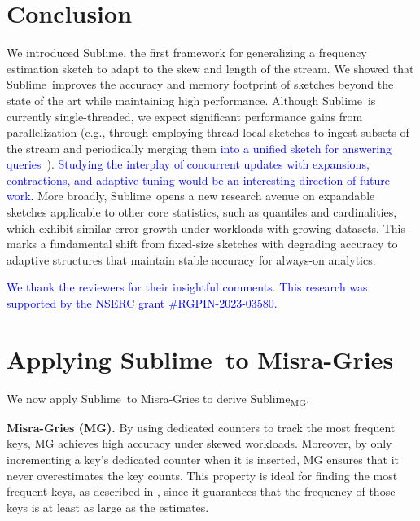 \documentclass[sigconf]{acmart}
\newcommand{\sketch}{Sublime}
\newcommand{\sketchmg}{\sketch\textsubscript{MG}\xspace}
\begin{document}
\section{Conclusion}
We introduced \sketch, the first framework for generalizing a frequency
estimation sketch to adapt to the skew and length of the stream. We showed that
\sketch\ improves the accuracy and memory footprint of sketches beyond the
state of the art while maintaining high performance. Although \sketch\ is
currently single-threaded, we expect significant performance gains from
parallelization (e.g., through employing thread-local sketches to ingest
subsets of the stream and periodically merging them \textcolor{blue}{into a unified sketch for
answering queries}~\cite{FastConcurrentDataSketches,FPGASketching}). \textcolor{blue}{Studying
the interplay of concurrent updates with expansions, contractions, and adaptive
tuning would be an interesting direction of future work.} More broadly, \sketch\
opens a new research avenue on expandable sketches applicable to other core
statistics, such as quantiles and cardinalities, which exhibit similar error
growth under workloads with growing datasets. This marks a fundamental shift
from fixed-size sketches with degrading accuracy to adaptive structures that
maintain stable accuracy for always-on analytics.

\begin{acks}
  \textcolor{blue}{We thank the reviewers for their insightful comments. This
  research was supported by the NSERC grant \#RGPIN-2023-03580.}
\end{acks}





\ifappendix
\clearpage
\newpage

\appendix

\section{Applying \sketch\ to Misra-Gries}\label{sec:mg}
We now apply \sketch\ to Misra-Gries to derive \sketchmg.

\textbf{Misra-Gries (MG).}
By using dedicated counters to track the most frequent keys, MG achieves high
accuracy under skewed workloads. Moreover, by only incrementing a key's
dedicated counter when it is inserted, MG ensures that it never overestimates
the key counts. This property is ideal for finding the most frequent keys, as
described in \Cref{sec:introduction}, since it guarantees that the frequency of
those keys is at least as large as the estimates.
\end{document}
